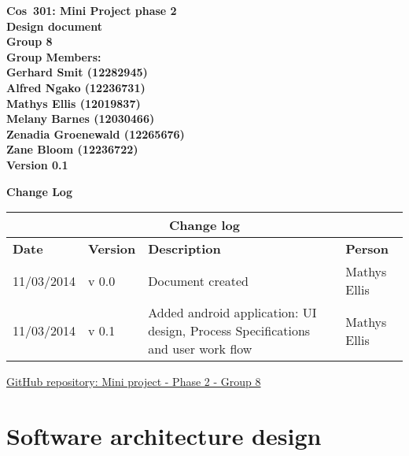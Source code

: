\documentclass[12pt]{article}
\newcommand{\Title}{Design document} %
\newcommand{\Class}{Cos\ 301} %
\begin{document}
	\vspace{4em}
	
	\begin{center}%
	\LARGE \bf \Class: Mini Project phase 2 \\
	  \LARGE \bf \Title \\[4em]
	  \LARGE {\bf Group 8}\\[1em]
	  \LARGE {\bf Group Members:}\\[2em]
	  \large
	  	 Gerhard Smit					(12282945) \\[1em]
	     Alfred Ngako					(12236731) \\[1em]
	     Mathys Ellis					(12019837) \\[1em]
	     Melany Barnes					(12030466) \\[1em]
	     Zenadia Groenewald				(12265676) \\[1em]
	     Zane Bloom						(12236722) \\[1em]
	     {\bf Version 0.1}
	    
	\end{center}
	
	\newpage
		{\LARGE \bf Change Log}\\[2em]
		
		\begin{center}
		\begin{tabular}{|l|p{1.4cm}|p{8cm}|p{2.8cm}|}
		\hline
		\multicolumn{4}{|c|}{\bf Change log} \\
		\hline
		\bf Date & \bf Version & \bf Description & \bf Person \\
		\hline
		11/03/2014 & v 0.0 & Document created & Mathys Ellis \\
		\hline
		11/03/2014 & v 0.1 & Added android application: UI design, Process Specifications and user work flow & Mathys Ellis \\
		\hline
		\end{tabular}
		\end{center}
		
	\newpage
	\tableofcontents
	
	\vspace{0.5in}
	
	\begin{flushleft}
		\LARGE\href{https://github.com/mox1990/COS_301_GROUP8_Phase_2}{GitHub repository: Mini project - Phase 2 -  Group 8}
	\end{flushleft}
	
	\newpage
	\section{Software architecture design}
	
\end{document}
